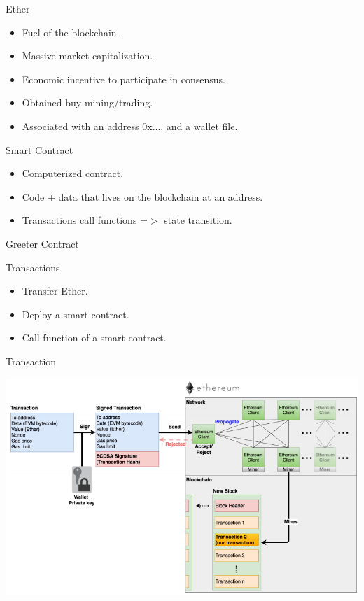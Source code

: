 \documentclass{beamer}
\begin{document}
\begin{frame}{Ether}
	\begin{itemize}
		\item {
			Fuel of the blockchain.
		}
		\item {
			Massive market capitalization.
		}
		\item {
			Economic incentive to participate in consensus.
		}
		\item {
			Obtained buy mining/trading.
		}
		\item {
			Associated with an address 0x.... and a wallet file.
		}
	\end{itemize}
\end{frame}

\begin{frame}{Smart Contract}
	\begin{itemize}
		\item {
			Computerized contract.
		}
		\item {
			Code + data that lives on the blockchain at an address.
		}
		\item {
			Transactions call functions =$>$ state transition.
		}
	\end{itemize}
\end{frame}

\begin{frame}{Greeter Contract}
	
\end{frame}

\begin{frame}{Transactions}
	\begin{itemize}
		\item {
			Transfer Ether.
		}
		\item {
			Deploy a smart contract.
		}
		\item {
			Call function of a smart contract.
		}
	\end{itemize}
\end{frame}

\begin{frame}{Transaction}
	\begin{center}
		\includegraphics[width=1\linewidth]{Transaction}
	\end{center}
\end{frame}
\end{document}
